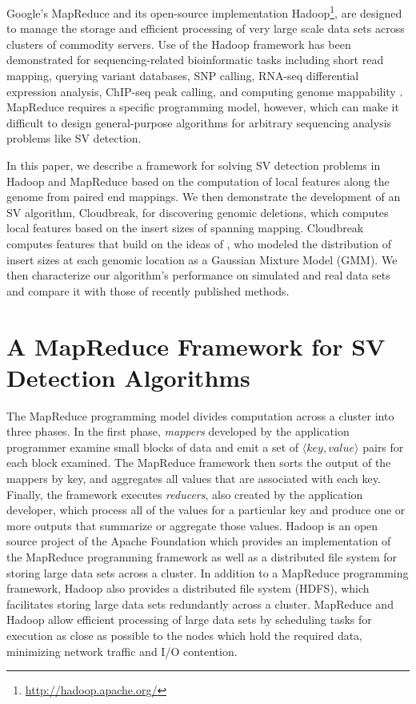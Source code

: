 \documentclass[11pt]{article}
\begin{document}
Google's MapReduce \autocite{Dean:2008p277} and its open-source implementation Hadoop\footnote{\url{http://hadoop.apache.org/}}, are designed to manage the storage and efficient processing of very large scale data sets across clusters of commodity servers. Use of the Hadoop framework has been demonstrated for sequencing-related bioinformatic tasks including short read mapping, \autocite{Schatz:2009p278} querying variant databases, \autocite{Oconnor:2010p1835} SNP calling, \autocite{Langmead:2009p1225} RNA-seq differential expression analysis, \autocite{Langmead:2010p1268} ChIP-seq peak calling, \autocite{Feng:2011p1228} and computing genome mappability \autocite{Lee:2012bk}. MapReduce requires a specific programming model, however, which can make it difficult to design general-purpose algorithms for arbitrary sequencing analysis problems like SV detection.

In this paper, we describe a framework for solving SV detection problems in Hadoop and MapReduce based on the computation of local features along the genome from paired end mappings. We then demonstrate the development of an SV algorithm, Cloudbreak, for discovering genomic deletions, which computes local features based on the insert sizes of spanning mapping. Cloudbreak computes features that build on the ideas of \autocite{Lee:2009da}, who modeled the distribution of insert sizes at each genomic location as a Gaussian Mixture Model (GMM). We then characterize our algorithm's performance on simulated and real data sets and compare it with those of recently published methods.

\section{A MapReduce Framework for SV Detection Algorithms}

The MapReduce programming model \autocite{Dean:2008p277} divides computation across a cluster into three phases. In the first phase, \emph{mappers} developed by the application programmer examine small blocks of data and emit a set of $\langle key, value \rangle$ pairs for each block examined. The MapReduce framework then sorts the output of the mappers by key, and aggregates all values that are associated with each key. Finally, the framework executes \emph{reducers}, also created by the application developer, which process all of the values for a particular key and produce one or more outputs that summarize or aggregate those values. Hadoop is an open source project of the Apache Foundation which provides an implementation of the MapReduce programming framework as well as a distributed file system for storing large data sets across a cluster. In addition to a MapReduce programming framework, Hadoop also provides a distributed file system (HDFS), which facilitates storing large data sets redundantly across a cluster. MapReduce and Hadoop allow efficient processing of large data sets by scheduling tasks for execution as close as possible to the nodes which hold the required data, minimizing network traffic and I/O contention.
\end{document}
